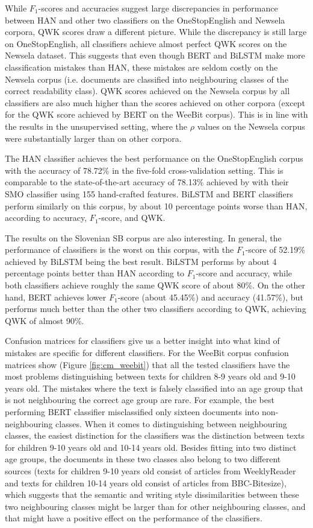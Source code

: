 \documentclass{clv3}
\begin{document}
While $F_1$-scores and accuracies suggest large discrepancies in performance between HAN and other two classifiers on the OneStopEnglish and Newsela corpora, QWK scores draw a different picture. While the discrepancy is still large on OneStopEnglish, all classifiers achieve almost perfect QWK scores on the Newsela dataset. This suggests that even though BERT and BiLSTM make more classification mistakes than HAN, these mistakes are seldom costly on the Newsela corpus (i.e. documents are classified into neighbouring classes of the correct readability class). QWK scores achieved on the Newsela corpus by all classifiers are also much higher than the scores achieved on other corpora (except for the QWK score achieved by BERT on the WeeBit corpus). This is in line with the results in the unsupervised setting, where the $\rho$ values on the Newsela corpus were substantially larger than on other corpora.    

The HAN classifier achieves the best performance on the OneStopEnglish corpus with the accuracy of 78.72\% in the five-fold cross-validation setting. This is comparable to the state-of-the-art accuracy of 78.13\% achieved by \citet{vajjala2018onestopenglish} with their SMO classifier using 155 hand-crafted features. BiLSTM and BERT classifiers perform similarly on this corpus, by about 10 percentage points worse than HAN, according to accuracy, $F_1$-score, and QWK. 

The results on the  Slovenian SB corpus are also interesting. In general, the performance of classifiers is the worst on this corpus, with the $F_1$-score of 52.19\% achieved by BiLSTM being the best result. BiLSTM performs by about 4 percentage points better than HAN according to $F_1$-score and accuracy, while both classifiers achieve roughly the same QWK score of about 80\%. On the other hand, BERT achieves lower $F_1$-score (about 45.45\%) and accuracy (41.57\%), but performs much better than the other two classifiers according to QWK, achieving QWK of almost 90\%. 

Confusion matrices for classifiers give us a better insight into what kind of mistakes are specific for different classifiers. For the WeeBit corpus confusion matrices show (Figure \ref{fig:cm_weebit}) that all the tested classifiers have the most problems distinguishing between texts for children 8-9 years old and 9-10 years old. The mistakes where the text is falsely classified into an age group that is not neighbouring the correct age group are rare. For example, the best performing BERT classifier misclassified only sixteen documents into non-neighbouring classes. When it comes to distinguishing between neighbouring classes, the easiest distinction for the classifiers was the distinction between texts for children 9-10 years old and 10-14 years old. Besides fitting into two distinct age groups, the documents in these two classes also belong to two different sources (texts for children 9-10 years old consist of articles from WeeklyReader and texts for children 10-14 years old consist of articles from BBC-Bitesize), which suggests that the semantic and writing style dissimilarities between these two neighbouring classes might be larger than for other neighbouring classes, and that might have a positive effect on the performance of the classifiers.
\end{document}
